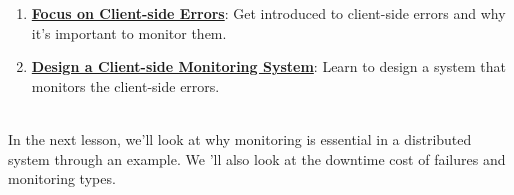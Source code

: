 \begin{enumerate}
\begin{enumerate}
\item
\href{https://www.educative.io/courses/grokking-the-system-design-interview/focus-on-client-side-errors-in-a-monitoring-system}{\textbf{Focus on Client-side Errors}}: Get introduced to client-side errors and why it's important to monitor them.
\item
\href{https://www.educative.io/courses/grokking-the-system-design-interview/design-of-a-client-side-monitoring-system}{\textbf{Design a Client-side Monitoring System}}: Learn to design a system that monitors the client-side errors.
\end{enumerate}
\end{enumerate}
\\
In the next lesson, we'll look at why monitoring is essential in a distributed system through an example. We 'll also look at the downtime cost of failures and monitoring types.

